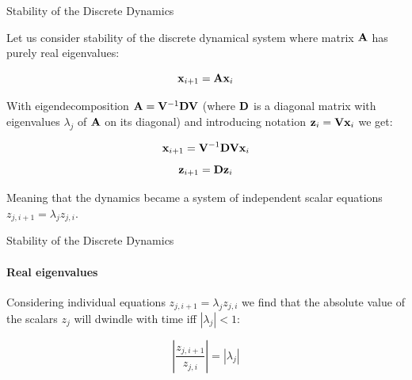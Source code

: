 \documentclass{beamer}
\begin{document}
\begin{frame}{Stability of the Discrete Dynamics}
	\begin{flushleft}
		
		Let us consider stability of the discrete dynamical system where matrix $\mathbf{A}$ has purely real eigenvalues:
		
		\begin{equation}
			\mathbf{x}_{i+1} = \mathbf{A}\mathbf{x}_i
		\end{equation}		
		
		With eigendecomposition $\mathbf{A} = \mathbf{V}^{-1} \mathbf{D} \mathbf{V}$ (where $\mathbf{D}$ is a diagonal matrix with eigenvalues $\lambda_j$ of $\mathbf{A}$ on its diagonal)  and introducing notation $\mathbf{z}_i = \mathbf{V}\mathbf{x}_i$ we get:
		
		\begin{equation}
			\mathbf{x}_{i+1} = \mathbf{V}^{-1} \mathbf{D} \mathbf{V}\mathbf{x}_i
		\end{equation}
		\begin{equation}
			\mathbf{z}_{i+1} =  \mathbf{D} \mathbf{z}_i
		\end{equation}
		
		Meaning that the dynamics became a system of independent scalar equations $z_{j, i+1} =  \lambda_j z_{j, i}$. 
		
		
	\end{flushleft}
\end{frame}




\begin{frame}{Stability of the Discrete Dynamics}
	\framesubtitle{Real eigenvalues}
	\begin{flushleft}
		
		Considering individual equations $z_{j, i+1} =  \lambda_j z_{j, i}$ we find that the absolute value of the scalars $z_{j}$ will dwindle with time iff $|\lambda_j| < 1$:
		
		\begin{equation}
			\left| \frac{z_{j, i+1}}{z_{j, i}} \right | =   | \lambda_j |
		\end{equation}
		 
		
	\end{flushleft}
\end{frame}
\end{document}
